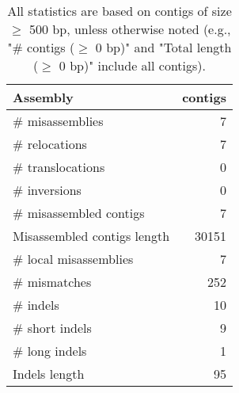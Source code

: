 \documentclass[12pt,a4paper]{article}
\begin{document}
\begin{table}[ht]
\begin{center}
\caption{All statistics are based on contigs of size $\geq$ 500 bp, unless otherwise noted (e.g., "\# contigs ($\geq$ 0 bp)" and "Total length ($\geq$ 0 bp)" include all contigs).}
\begin{tabular}{|l*{1}{|r}|}
\hline
Assembly & contigs \\ \hline
\# misassemblies & 7 \\ \hline
\hspace{5mm}\# relocations & 7 \\ \hline
\hspace{5mm}\# translocations & 0 \\ \hline
\hspace{5mm}\# inversions & 0 \\ \hline
\# misassembled contigs & 7 \\ \hline
Misassembled contigs length & 30151 \\ \hline
\# local misassemblies & 7 \\ \hline
\# mismatches & 252 \\ \hline
\# indels & 10 \\ \hline
\hspace{5mm}\# short indels & 9 \\ \hline
\hspace{5mm}\# long indels & 1 \\ \hline
Indels length & 95 \\ \hline
\end{tabular}
\end{center}
\end{table}
\end{document}
